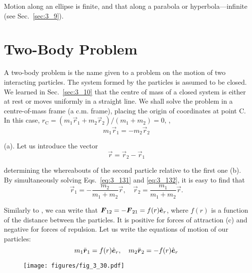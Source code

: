 Motion along an ellipse is finite, and that along a parabola or hyperbola---infinite (see Sec.~\ref{sec:3_9}).

\section{Two-Body Problem}\label{sec:3_19}

A two-body problem is the name given to a problem on the motion of two interacting particles. The system formed by the particles is assumed to be closed. We learned in Sec.~\ref{sec:3_10} that the centre of mass of a closed system is either at rest or moves uniformly in a straight line. We shall solve the problem in a centre-of-mass frame (a c.m. frame), placing the origin of coordinates at point C. In this case, $r_{\text{C}}=(m_1\vec{r}_1+m_2\vec{r}_2)/(m_1+m_2)=0$, \ie,
\begin{equation}\label{eq:3_131}
m_1\vec{r}_1 = -m_2\vec{r}_2
\end{equation}

\noindent
(a). Let us introduce the vector
\begin{equation}\label{eq:3_132}
\vec{r} = \vec{r}_2 - \vec{r}_1
\end{equation}

\noindent
determining the whereabouts of the second particle relative to the first one (b). By simultaneously solving Eqs.~\eqref{eq:3_131} and \eqref{eq:3_132}, it is easy to find that
\begin{equation}\label{eq:3_133}
\vec{r}_1 = -\frac{m_2}{m_1+m_2}\vec{r},\quad \vec{r}_2 = \frac{m_1}{m_1+m_2}\vec{r}.
\end{equation}

Similarly to , we can write that $\boldsymbol{F}_{12}=-\boldsymbol{F}_{21}=f(r)\hat{\boldsymbol{e}}_{r}$, where $f(r)$ is a function of the distance between the particles. It is positive for forces of attraction (c) and negative for forces of repulsion. Let us write the equations of motion of our particles:
\begin{equation*}
m_1\ddot{\boldsymbol{r}}_1 = f(r)\hat{\boldsymbol{e}}_{r},\quad m_2\ddot{\boldsymbol{r}}_2 = -f(r)\hat{\boldsymbol{e}}_{r}
\end{equation*}

\begin{figure}[t]
	\begin{center}
		\texttt{[image: figures/fig\_3\_30.pdf]}
		\caption[]{}
		\label{fig:3_30}
	\end{center}
\vspace{-0.7cm}
\end{figure}

